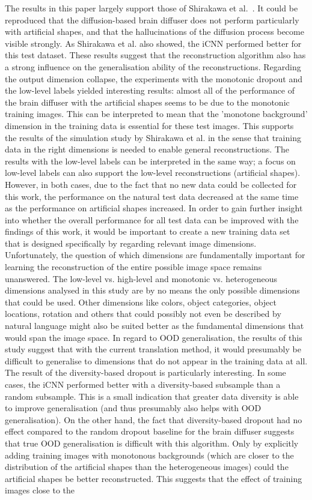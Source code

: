 The results in this paper largely support those of Shirakawa et al.~\cite{shirakawaSpuriousReconstructionBrain2024}. It could be reproduced that the diffusion-based brain diffuser does not perform particularly  with artificial shapes, and that the hallucinations of the diffusion process become visible strongly. As Shirakawa et al. also showed, the iCNN performed better for this test dataset. These results suggest that the reconstruction algorithm also has a strong influence on the generalisation ability of the reconstructions. Regarding the output dimension collapse, the experiments with the monotonic dropout and the low-level labels yielded interesting results: almost all of the performance of the brain diffuser with the artificial shapes seems to be due to the monotonic training images. This can be interpreted to mean that the 'monotone background' dimension in the training data is essential for these test images. This supports the results of the simulation study by Shirakawa et al. in the sense that training data in the right dimensions is needed to enable general reconstructions. The results with the low-level labels can be interpreted in the same way; a focus on low-level labels can also support the low-level reconstructions (artificial shapes). However, in both cases, due to the fact that no new data could be collected for this work, the performance on the natural test data decreased at the same time as the performance on artificial shapes increased. In order to gain further insight into whether the overall performance for all test data can be improved with the findings of this work, it would be important to create a new training data set that is designed specifically by regarding relevant image dimensions. Unfortunately, the question of which dimensions are fundamentally important for learning the reconstruction of the entire possible image space remains unanswered. The low-level vs. high-level and monotonic vs. heterogeneous dimensions analysed in this study are by no means the only possible dimensions that could be used. Other dimensions like colors, object categories, object locations, rotation and others that could possibly not even be described by natural language might also be suited better as the fundamental dimensions that would span the image space. In regard to OOD generalisation, the results of this study suggest that with the current translation method, it would presumably be difficult to generalise to dimensions that do not appear in the training data at all. The result of the diversity-based dropout is particularly interesting. In some cases, the iCNN performed better with a diversity-based subsample than a random subsample. This is a small indication that greater data diversity is able to improve generalisation (and thus presumably also helps with OOD generalisation). On the other hand, the fact that diversity-based dropout had no effect compared to the random dropout baseline for the brain diffuser suggests that true OOD generalisation is difficult with this algorithm. Only by explicitly adding training images with monotonous backgrounds (which are closer to the distribution of the artificial shapes than the heterogeneous images) could the artificial shapes be better reconstructed. This suggests that the effect of training images close to the 